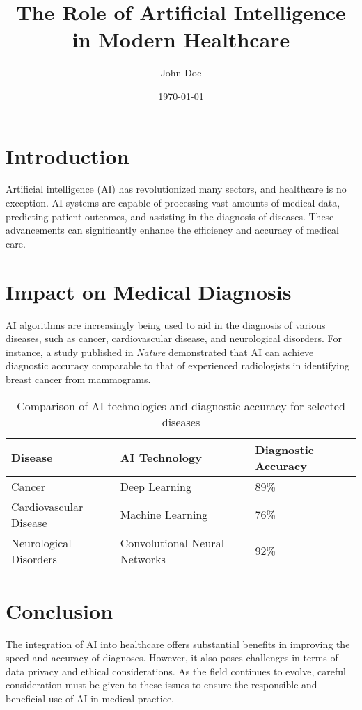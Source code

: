 \documentclass[11pt]{article}
\title{The Role of Artificial Intelligence in Modern Healthcare}
\author{John Doe}
\date{\today}
\begin{document}
\maketitle

\section{Introduction}
Artificial intelligence (AI) has revolutionized many sectors, and healthcare is no exception. AI systems are capable of processing vast amounts of medical data, predicting patient outcomes, and assisting in the diagnosis of diseases. These advancements can significantly enhance the efficiency and accuracy of medical care.

\section{Impact on Medical Diagnosis}
AI algorithms are increasingly being used to aid in the diagnosis of various diseases, such as cancer, cardiovascular disease, and neurological disorders. For instance, a study published in \textit{Nature} demonstrated that AI can achieve diagnostic accuracy comparable to that of experienced radiologists in identifying breast cancer from mammograms. 

\begin{table}[h!]
\centering
\begin{tabular}{|l|l|l|}
\hline
\textbf{Disease} & \textbf{AI Technology} & \textbf{Diagnostic Accuracy} \\ \hline
Cancer & Deep Learning & 89\% \\ \hline
Cardiovascular Disease & Machine Learning & 76\% \\ \hline
Neurological Disorders & Convolutional Neural Networks & 92\% \\ \hline
\end{tabular}
\caption{Comparison of AI technologies and diagnostic accuracy for selected diseases}
\end{table}

\section{Conclusion}
The integration of AI into healthcare offers substantial benefits in improving the speed and accuracy of diagnoses. However, it also poses challenges in terms of data privacy and ethical considerations. As the field continues to evolve, careful consideration must be given to these issues to ensure the responsible and beneficial use of AI in medical practice.



\end{document}
